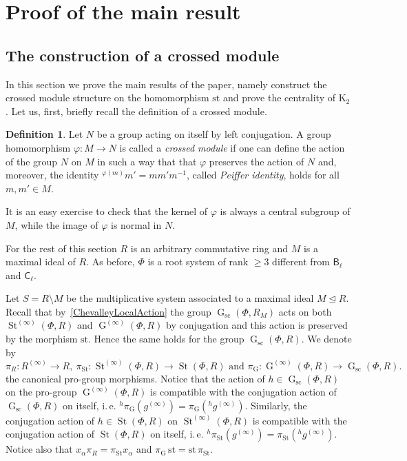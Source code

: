 \documentclass[oneside, 11pt]{amsart}
\numberwithin{equation}{section}
\theoremstyle{definition}
\newtheorem{df}[lemma]{Definition} \Crefname{df}{Definition}{Definitions}
\theoremstyle{remark}
\DeclareMathOperator\St{St}
\DeclareMathOperator\GG{G}
\newcommand{\up}[2]{{^{#1}\!{#2}}}
\newcommand{\rB}{\mathsf{B}}
\newcommand{\rC}{\mathsf{C}}
\begin{document}
\section{Proof of the main result} \label{sec:proof-main}
\subsection{The construction of a crossed module}
In this section we prove the main results of the paper, namely construct the crossed module structure on the homomorphism $\mathrm{st}$ and prove the centrality of $\mathrm{K}_2$. Let us, first, briefly recall the definition of a crossed module. 

\begin{df} \label{df:crossed-module}
Let $N$ be a group acting on itself by left conjugation.
A group homomorphism $\varphi\colon M \to N$ is called a {\it crossed module} if one can define the action of the group $N$ on $M$ in such a way that that $\varphi$ preserves the action of $N$ and, moreover, the identity ${}^{\varphi(m)}\!m' = m m' m^{-1}$, called {\it Peiffer identity}, holds for all $m, m' \in M$.
\end{df}
It is an easy exercise to check that the kernel of $\varphi$ is always a central subgroup of $M$, while the image of $\varphi$ is normal in $N$.

For the rest of this section $R$ is an arbitrary commutative ring and $M$ is a maximal ideal of $R$.
As before, \(\Phi\) is a root system of rank \(\geq 3\) different from \(\rB_\ell\) and \(\rC_\ell\).

Let $S = R\setminus M$ be the multiplicative system associated to a maximal ideal $M \trianglelefteq R$.
Recall that by~\cref{ChevalleyLocalAction} the group $\GG_{\mathrm{sc}}(\Phi, R_M)$ acts on both $\St^{(\infty)}(\Phi, R)$ and $\GG^{(\infty)}(\Phi, R)$ by conjugation and this action is preserved by the morphism $\mathrm{st}$. Hence the same holds for the group $\GG_{\mathrm{sc}}(\Phi, R)$.
We denote by \[\pi_R \colon R^{(\infty)} \to R,\ \pi_{\St} \colon \St^{(\infty)}(\Phi, R) \to \St(\Phi, R)\text{ and } \pi_{\GG} \colon \GG^{(\infty)}(\Phi, R) \to \GG_{\mathrm{sc}}(\Phi, R).\] the canonical pro-group morphisms. Notice that the action of $h\in \GG_{\mathrm{sc}}(\Phi, R)$ on the pro-group $\GG^{(\infty)}(\Phi, R)$ is compatible with the conjugation action of $\GG_{\mathrm{sc}}(\Phi, R)$ on itself, i.\,e. $\up{h}\pi_{\GG}(g^{(\infty)}) = \pi_{\GG}(\up{h} {g^{(\infty)}})$.
Similarly, the conjugation action of $h\in \St(\Phi, R)$ on $\St^{(\infty)}(\Phi, R)$ is compatible with the conjugation action of $\St(\Phi, R)$ on itself, i.\,e. $\up{h}\pi_{\St}(g^{(\infty)}) = \pi_{\St}(\up{h}{g^{(\infty)}})$.
Notice also that $x_\alpha \pi_R = \pi_{\St} x_\alpha$ and $\pi_{\GG}\, \mathrm{st} = \mathrm{st}\, \pi_{\St}$.
\end{document}
